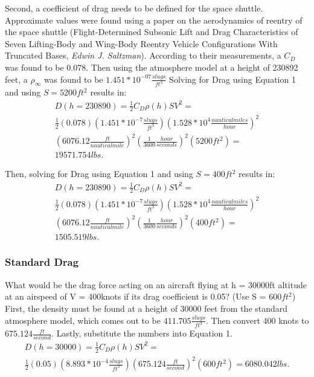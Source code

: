 \documentclass[12pt]{report}
\begin{document}
Second, a coefficient of drag needs to be defined for the space shuttle. Approximate values were found using a paper on the aerodynamics of reentry of the space shuttle (Flight-Determined Subsonic Lift and Drag Characteristics of Seven Lifting-Body and Wing-Body Reentry Vehicle Configurations With Truncated Bases, \emph{Edwin J. Saltzman}). According to their measurements, a \(C_{D}\) was found to be 0.078.
Then using the atmosphere model at a height of 230892 feet, a \(\rho_{\infty}\) was found to be \(1.451*10^{-07} \frac{slugs}{ft^3}\)
\newline
\newline
Solving for Drag using Equation 1 and using \(S = 5200 ft^2\) results in:
\begin{equation}
\begin{split}
	D(h = 230890) = \frac{1}{2}C_{D}\rho(h)SV^2 = \\
	\frac{1}{2}(0.078)(1.451*10^{-7} \frac{slugs}{ft^3})
	(1.528 * 10^4 \frac{nautical miles}{hour})^2 \\
	(6076.12 \frac{ft}{nautical mile})^2(\frac{1}{3600} \frac{hour}{seconds})^2 (5200 ft^2) = 
	\\19571.754 lbs.
	\label{equation:shuttleDrag1}
\end{split}
\end{equation}

Then, solving for Drag using Equation 1 and using \(S = 400 ft^2\) results in:
\begin{equation}
\begin{split}
	D(h = 230890) = \frac{1}{2}C_{D}\rho(h)SV^2 = \\
	\frac{1}{2}(0.078)(1.451*10^{-7} \frac{slugs}{ft^3})
	(1.528 * 10^4 \frac{nautical miles}{hour})^2 \\
	(6076.12 \frac{ft}{nautical mile})^2(\frac{1}{3600} \frac{hour}{seconds})^2 (400 ft^2) = 
	\\1505.519 lbs.
	\label{equation:shuttleDrag1}
\end{split}
\end{equation}


\subsubsection{Standard Drag}
What would be the drag force acting on an aircraft flying at h = 30000ft altitude at an airspeed of V = 400knots if its drag coefficient is 0.05? (Use S = 600\(ft^2\)) 
\newline
\newline
First, the density must be found at a height of 30000 feet from the standard atmosphere model, which comes out to be \(411.705 \frac{slugs}{ft^3}\). Then convert 400 knots to \(675.124 \frac{ft}{second}\). Lastly, substitute the numbers into Equation 1.
\begin{equation}
\begin{split}
	D(h = 30000) = \frac{1}{2}C_{D}\rho(h)SV^2 = \\
	\frac{1}{2}(0.05)(8.893 * 10^{-4} \frac{slugs}{ft^3})
	(675.124 \frac{ft}{second})^2 (600 ft^2) =  6080.042 lbs.
	\label{equation:standardDrag}
\end{split}
\end{equation}
\end{document}
